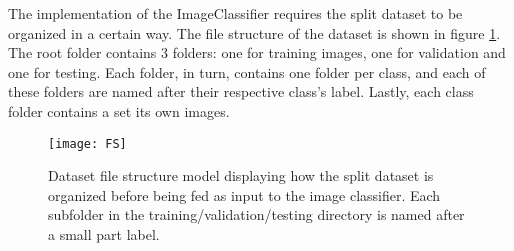 The implementation of the ImageClassifier requires the split dataset to be organized in a certain way. The file structure of the dataset is shown in figure \ref{fig:FS}. The root folder contains 3 folders: one for training images, one for validation and one for testing. Each folder, in turn, contains one folder per class, and each of these folders are named after their respective class's label. Lastly, each class folder contains a set its own images.

\begin{figure}[h]
\centering
  \texttt{[image: FS]}
\caption{Dataset file structure model displaying how the split dataset is organized before being fed as input to the image classifier. Each subfolder in the training/validation/testing directory is named after a small part label.}
\label{fig:FS}
\end{figure}
